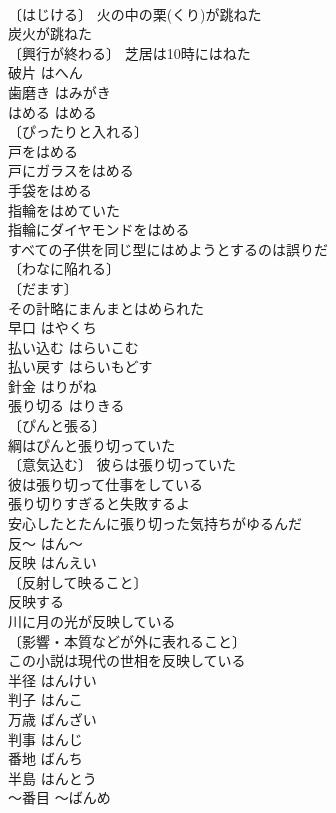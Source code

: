 \documentclass[8pt]{extreport}
\begin{document}
\begin{CJK}{UTF8}{min}
\\	〔はじける〕 火の中の栗(くり)が跳ねた 
\\	炭火が跳ねた 
\\	〔興行が終わる〕 芝居は10時にはねた 
\\	破片	はへん	
\\	歯磨き	はみがき	
\\	はめる	はめる	
\\	〔ぴったりと入れる〕
\\	戸をはめる 
\\	戸にガラスをはめる 
\\	手袋をはめる 
\\	指輪をはめていた 
\\	指輪にダイヤモンドをはめる 
\\	すべての子供を同じ型にはめようとするのは誤りだ 
\\	〔わなに陥れる〕
\\	〔だます〕
\\	その計略にまんまとはめられた 
\\	早口	はやくち	
\\	払い込む	はらいこむ	
\\	払い戻す	はらいもどす	
\\	針金	はりがね	
\\	張り切る	はりきる	
\\	〔ぴんと張る〕
\\	綱はぴんと張り切っていた 
\\	〔意気込む〕 彼らは張り切っていた 
\\	彼は張り切って仕事をしている 
\\	張り切りすぎると失敗するよ 
\\	安心したとたんに張り切った気持ちがゆるんだ 
\\	反～	はん～	
\\	反映	はんえい	
\\	〔反射して映ること〕
\\	反映する 
\\	川に月の光が反映している 
\\	〔影響・本質などが外に表れること〕
\\	この小説は現代の世相を反映している 
\\	半径	はんけい	
\\	判子	はんこ	
\\	万歳	ばんざい	
\\	判事	はんじ	
\\	番地	ばんち	
\\	半島	はんとう	
\\	～番目	～ばんめ	

\end{CJK}
\end{document}
